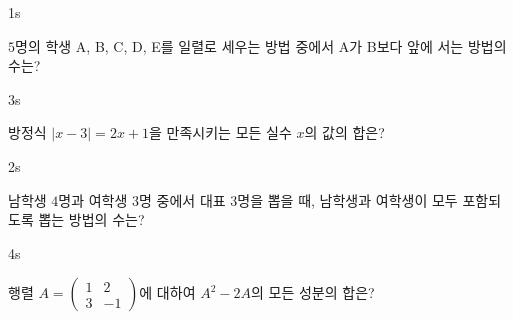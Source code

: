 \documentclass[10pt]{article}
\begin{document}


\setlength{\probboxheight}{65mm}

\begin{pagepair}
\noindent
\begin{minipage}[t][\probboxheight][t]{0.46\linewidth}
\begin{problem}{1}{s}
\par\smallskip
$5$명의 학생 A, B, C, D, E를 일렬로 세우는 방법 중에서 A가 B보다 앞에 서는 방법의 수는?
\begin{choices}
\end{choices}
\end{problem}
\end{minipage}\hfill
\begin{minipage}[t][\probboxheight][t]{0.46\linewidth}
\begin{problem}{3}{s}
\par\smallskip
방정식 $|x - 3| = 2x + 1$을 만족시키는 모든 실수 $x$의 값의 합은?
\begin{choices}
\end{choices}
\end{problem}
\end{minipage}
\par\vspace{4mm}
\noindent
\begin{minipage}[t][\probboxheight][t]{0.46\linewidth}
\begin{problem}{2}{s}
\par\smallskip
남학생 $4$명과 여학생 $3$명 중에서 대표 $3$명을 뽑을 때, 남학생과 여학생이 모두 포함되도록 뽑는 방법의 수는?
\begin{choices}
\end{choices}
\end{problem}
\end{minipage}\hfill
\begin{minipage}[t][\probboxheight][t]{0.46\linewidth}
\begin{problem}{4}{s}
\par\smallskip
행렬 $A = \begin{pmatrix} 1 & 2 \\ 3 & -1 \end{pmatrix}$에 대하여 $A^2 - 2A$의 모든 성분의 합은?
\begin{choices}
\end{choices}
\end{problem}
\end{minipage}
\end{pagepair}
\end{document}
